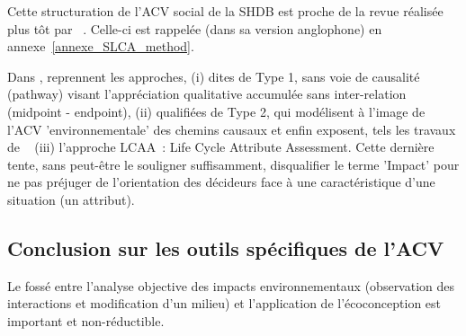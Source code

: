   Cette structuration de l'ACV social de la SHDB est proche de la revue réalisée plus tôt par \citeauthor{jorgensen_methodologies_2008}~\cite{jorgensen_methodologies_2008}.
  Celle-ci est rappelée (dans sa version anglophone) en annexe~\ref{annexe_SLCA_method}.\label{annexe_SLCA_method_retour}
  
  Dans , \citeauthor{wu_social_2014} reprennent les approches, (i) dites de Type 1, sans voie de causalité (pathway) visant l'appréciation qualitative accumulée sans inter-relation (midpoint - endpoint), (ii)  qualifiées de Type 2, qui modélisent à l'image de l'ACV 'environnementale' des chemins causaux et enfin exposent, tels les travaux de \citeauthor{dreyer_characterisation_2010}~ \cite{dreyer_characterisation_2010} (iii) l'approche LCAA~: Life Cycle Attribute Assessment.
  Cette dernière tente, sans peut-être le souligner suffisamment, disqualifier le terme 'Impact' pour ne pas préjuger de l'orientation des décideurs face à une caractéristique d'une situation (un attribut).
%  
% 
%  
%  
%
%    


\subsection{Conclusion sur les outils spécifiques de l'ACV}
Le fossé entre l’analyse objective des impacts environnementaux (observation des interactions et modification d'un milieu) et l’application de l’écoconception est important et non-réductible.

